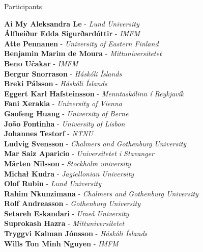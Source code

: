\documentclass[12pt, openany, twoside]{report}      %
\begin{document}
\noindent
{\LARGE Participants}

\bigskip
\bigskip
\noindent
\textbf{Ai My Aleksandra Le} -
\textit{Lund University}
\\
\textbf{Álfheiður Edda Sigurðardóttir} -
\textit{IMFM}
\\
\textbf{Atte Pennanen} -
\textit{University of Eastern Finland}
\\
\textbf{Benjamin Marim de Moura} -
\textit{Mittuniversitetet}
\\
\textbf{Beno Učakar} -
\textit{IMFM}
\\
\textbf{Bergur Snorrason} -
\textit{Háskóli Íslands}
\\
\textbf{Breki Pálsson} -
\textit{Háskóli Íslands}
\\
\textbf{Eggert Karl Hafsteinsson} -
\textit{Menntaskólinn í Reykjavík}
\\
\textbf{Fani Xerakia} -
\textit{University of Vienna}
\\
\textbf{Gaofeng Huang} -
\textit{University of Berne}
\\
\textbf{João Fontinha} -
\textit{University of Lisbon}
\\
\textbf{Johannes Testorf} -
\textit{NTNU}
\\
\textbf{Ludvig Svensson} -
\textit{Chalmers and Gothenburg University}
\\
\textbf{Mar Saiz Aparicio} -
\textit{Universitetet i Stavanger}
\\
\textbf{Mårten Nilsson} -
\textit{Stockholm university}
\\
\textbf{Michał Kudra} -
\textit{Jagiellonian University}
\\
\textbf{Olof Rubin} -
\textit{Lund University}
\\
\textbf{Rahim Nkunzimana} -
\textit{Chalmers and Gothenburg University}
\\
\textbf{Rolf Andreasson} -
\textit{Gothenburg University}
\\
\textbf{Setareh Eskandari} -
\textit{Umeå University}
\\
\textbf{Suprokash Hazra} -
\textit{Mittuniversitetet}
\\
\textbf{Tryggvi Kalman Jónsson} -
\textit{Háskóli Íslands}
\\
\textbf{Wills Ton Minh Nguyen} -
\textit{IMFM}
\restoregeometry

\newpage
\end{document}
